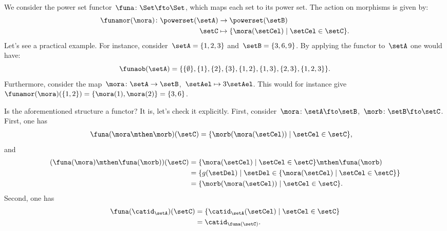 \begin{example}
    \label{ex:powerset_functor}
    We consider the power set functor~$\funa\colon \Set \fto \Set$, which maps each set to its power set.
    The action on morphisms is given by:
    \begin{equation*}
        \begin{aligned}
            \funamor(\mora)\colon \powerset(\setA) & \to \powerset(\setB)                               \\
            \setC                                  & \mapsto \{\mora(\setCel) \mid \setCel \in \setC\}. 
        \end{aligned}
    \end{equation*}
    Let's see a practical example.
    For instance, consider~$\setA=\{1,2,3\}$ and~$\setB=\{3,6,9\}$.
    By applying the functor to~$\setA$ one would have:
    \begin{equation*}
        \funaob(\setA)=\{\{\emptyset\}, \{1\}, \{2\}, \{3\}, \{1,2\}, \{1,3\}, \{2,3\}, \{1,2,3\}\}.
    \end{equation*}
    Furthermore, consider the map~$\mora\colon \setA\to \setB$,~$\setAel\mapsto 3\setAel$.
    This would for instance give~$\funamor(\mora)(\{1,2\})=\{\mora(1),\mora(2)\}=\{3,6\}$.

    Is the aforementioned structure a functor?
    It is, let's check it explicitly.
    First, consider~$\mora\colon \setA\fto \setB$,~$\morb\colon \setB \fto \setC$.
    First, one has
    \begin{equation*}
        \begin{aligned}
            \funa(\mora\mthen \morb)(\setC) & =\{ \morb(\mora(\setCel))\mid \setCel \in \setC\}, 
        \end{aligned}
    \end{equation*}
    and
    \begin{equation*}
        \begin{aligned}
            (\funa(\mora)\mthen \funa(\morb))(\setC)
             & =\{ \mora(\setCel) \mid \setCel \in \setC\}\mthen \funa(\morb)          \\
             & =\{g(\setDel)\mid \setDel \in \{\mora(\setCel)\mid \setCel\in \setC\}\} \\
             & =\{ \morb(\mora(\setCel))\mid \setCel \in \setC\}.                      
        \end{aligned}
    \end{equation*}
    Second, one has
    \begin{equation*}
        \begin{aligned}
            \funa(\catid_\setA)(\setC) & = \{\catid_\setA(\setCel)\mid \setCel \in \setC\} \\
                                       & =\catid_{\funa(\setC)}.                           
        \end{aligned}
    \end{equation*}
\end{example}

